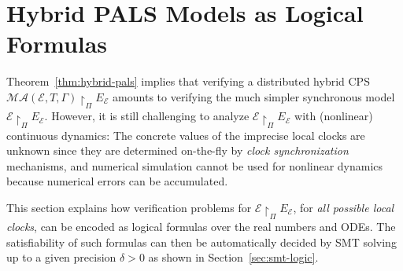 

\section{Hybrid PALS Models as Logical Formulas}
\label{sec:smt-encoding}

Theorem~\ref{thm:hybrid-pals} implies that 
 verifying 
 a distributed hybrid CPS $\mathcal{MA}(\mathcal{E}, T, \Gamma) \restriction_{\Pi} E_\mathcal{E}$
amounts to  verifying the much  simpler synchronous model $\mathcal{E} \restriction_{\Pi} E_\mathcal{E}$.
However, it is still challenging to analyze $\mathcal{E} \restriction_{\Pi} E_\mathcal{E}$ 
with (nonlinear)  continuous dynamics: 
The concrete values of the imprecise local clocks are unknown since they  %
are determined on-the-fly by  \emph{clock synchronization} mechanisms, 
and 
numerical simulation cannot  be used for nonlinear dynamics
because numerical errors can be accumulated.

This section explains how verification  problems for  
$\mathcal{E}\restriction_{\Pi}E_\mathcal{E}$, for \emph{all possible local clocks},
can be  encoded as logical formulas over the real numbers and ODEs.
The satisfiability of such formulas can then be automatically decided by SMT solving up to a given precision $\delta > 0$
as shown in Section~\ref{sec:smt-logic}.


